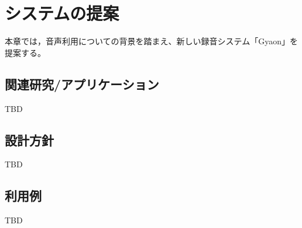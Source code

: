 \chapter{システムの提案}
\label{chap:proposal}

本章では，音声利用についての背景を踏まえ、新しい録音システム「Gyaon」を提案する。

\newpage

\section{関連研究/アプリケーション}

TBD

\section{設計方針}

TBD

\section{利用例}

TBD
